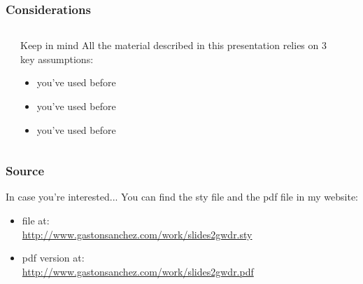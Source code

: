 \documentclass{beamer}
\begin{document}

\begin{frame}
\frametitle{Considerations}

\begin{columns}[t]
\begin{column}{0.1\textwidth}
\end{column}
\begin{column}{0.8\textwidth}

\begin{block}{Keep in mind}
All the material described in this presentation relies on 3 key assumptions:
\begin{itemize}
 \item you've used  before
 \item you've used  before
 \item you've used  before
\end{itemize}
\end{block}

\end{column}
\begin{column}{0.1\textwidth}
\end{column}
\end{columns}

\end{frame}


\begin{frame}
\frametitle{Source}

\begin{block}{In case you're interested...}
You can find the sty file and the pdf file in my website:
 \begin{itemize}
  \item {} file at: \\
  { \scriptsize \url{http://www.gastonsanchez.com/work/slides2gwdr.sty} }
  \item pdf version at: \\
  { \scriptsize \url{http://www.gastonsanchez.com/work/slides2gwdr.pdf} }
  \end{itemize}
\end{block}

\vspace{5mm}
{ \scriptsize
{}  \\
}

\end{frame}
\end{document}
